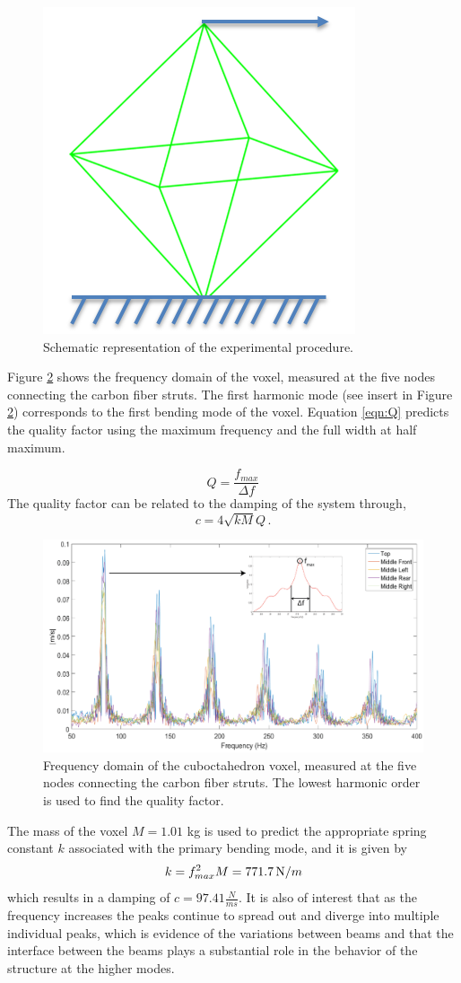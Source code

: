 \documentclass[11pt]{ucthesis}
\begin{document}
\begin{figure}[thpb]
\centering
\includegraphics[width=0.25\linewidth]{Figures/experimentalSetupDiagram.png}
\caption{Schematic representation of the experimental procedure. }
\label{fig:setUpD}
\end{figure}
Figure \ref{fig:FFTandQ} shows the frequency domain of the voxel, measured at the five nodes connecting the carbon fiber struts. The first harmonic mode (see insert in Figure \ref{fig:FFTandQ}) corresponds to the first bending mode of the voxel. Equation \ref{eqn:Q} predicts the quality factor using the maximum frequency and the full width at half maximum.

\begin{equation}
Q = \frac{f_{max}}{\Delta f}
\label{eqn:Q}
\end{equation}
The quality factor can be related to the damping of the system through,
\begin{equation}
c = 4 \sqrt{k M} Q \,.
\label{eqn:Q2c}
\end{equation}

\begin{figure}[thpb]
\centering
\includegraphics[width=0.75\linewidth]{Figures/FFTandQ.png}
\caption{Frequency domain of the cuboctahedron voxel, measured at the five nodes connecting the carbon fiber struts. The lowest harmonic order is used to find the quality factor.}
\label{fig:FFTandQ}
\end{figure}
The mass of the voxel $M=1.01$ kg is used to predict the appropriate spring constant $k$ associated with the primary bending mode, and it is given by
\begin{equation}
k = f_{max}^2 M = 771.7 \, {\mbox N/m}
\label{eqn:kfm}
\end{equation}
which results in a damping of $c = 97.41 \frac{N}{ms}$. It is also of interest that as the frequency increases the peaks continue to spread out and diverge into multiple individual peaks, which is evidence of the variations between beams and that the interface between the beams plays a substantial role in the behavior of the structure at the higher modes.
\end{document}
